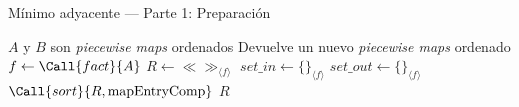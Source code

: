 \begin{algorithm}
\caption{Mínimo adyacente — Parte 1: Preparación}
\label{alg:minadj-ord}
\begin{algorithmic}[1]
\Require $A$ y $B$ son \textit{piecewise maps} ordenados
\Ensure Devuelve un nuevo \textit{piecewise maps} ordenado 
    \State $f \gets \Call{fact}{A}$
    \State $R \gets \ll\gg_{\langle f \rangle}$
    \State $set\_in \gets \{\}_{\langle f \rangle}$
    \State $set\_out \gets \{\}_{\langle f \rangle}$
    \State {}
    \State $\Call{sort}{R, \mathrm{mapEntryComp}}$
    \State \Return $R$
\EndFunction
\end{algorithmic}
\end{algorithm}


